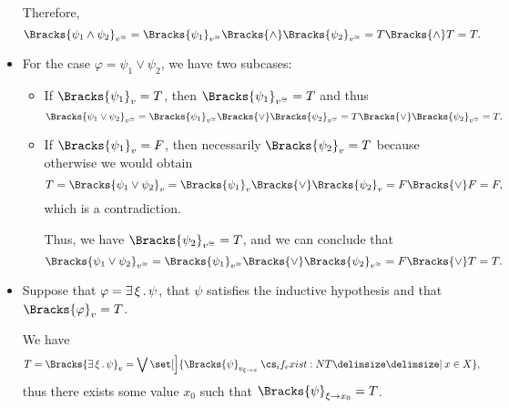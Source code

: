 \begin{defproof}
\begin{itemize}
    Therefore,
    \begin{equation*}
      \Bracks{\psi_1 \wedge \psi_2}_{v^{\cong}}
      =
      \Bracks{\psi_1}_{v^{\cong}} \Bracks{\wedge} \Bracks{\psi_2}_{v^{\cong}}
      =
      T \Bracks{\wedge} T
      =
      T.
    \end{equation*}

    \item For the case \( \varphi = \psi_1 \vee \psi_2 \), we have two subcases:
    \begin{itemize}
      \item If \( \Bracks{\psi_1}_v = T \), then \( \Bracks{\psi_1}_{v^{\cong}} = T \) and thus
      \begin{equation*}
        \Bracks{\psi_1 \vee \psi_2}_{v^{\cong}}
        =
        \Bracks{\psi_1}_{v^{\cong}} \Bracks{\vee} \Bracks{\psi_2}_{v^{\cong}}
        =
        T \Bracks{\vee} \Bracks{\psi_2}_{v^{\cong}}
        =
        T.
      \end{equation*}

      \item If \( \Bracks{\psi_1}_v = F \), then necessarily \( \Bracks{\psi_2}_v = T \) because otherwise we would obtain
      \begin{equation*}
        T
        =
        \Bracks{\psi_1 \vee \psi_2}_v
        =
        \Bracks{\psi_1}_v \Bracks{\vee} \Bracks{\psi_2}_v
        =
        F \Bracks{\vee} F
        =
        F,
      \end{equation*}
      which is a contradiction.

      Thus, we have \( \Bracks{\psi_2}_{v^{\cong}} = T \), and we can conclude that
      \begin{equation*}
        \Bracks{\psi_1 \vee \psi_2}_{v^{\cong}}
        =
        \Bracks{\psi_1}_{v^{\cong}} \Bracks{\vee} \Bracks{\psi_2}_{v^{\cong}}
        =
        F \Bracks{\vee} T
        =
        T.
      \end{equation*}
    \end{itemize}

    \item Suppose that \( \varphi = \exists \thinspace \xi \thinspace . \thinspace \psi \), that \( \psi \) satisfies the inductive hypothesis and that \( \Bracks{\varphi}_v = T \).

    We have
    \begin{equation*}
      T
      =
      \Bracks{ \qexists \xi \psi }_v
      =
      \bigvee\set[\Big]{ \Bracks{\psi}_{v_{\xi \to x}} \given* x \in X },
    \end{equation*}
    thus there exists some value \( x_0 \) such that \( \Bracks{\psi}_{\xi \to x_0} = T \).


\end{itemize}
\end{defproof}
